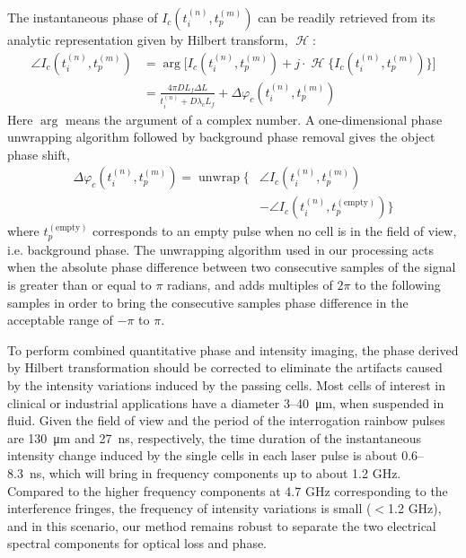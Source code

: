 \documentclass[aps,pra,reprint,longbibliography,superscriptaddress]{revtex4-1}
\DeclareMathOperator{\hilbert}{\mathcal{H}} %
\DeclareMathOperator{\unwrap}{unwrap} %
\begin{document}
The instantaneous phase of $I_c(t_i^{(n)}, t_p^{(m)})$ can be readily retrieved from its analytic representation given by Hilbert transform, $\hilbert$:
\begin{equation} \label{eqn:angle}
\begin{split}
\angle I_c(t_i^{(n)}, t_p^{(m)}) &= \arg\Big[I_c(t_i^{(n)}, t_p^{(m)}) + j \cdot \hilbert \lbrace I_c(t_i^{(n)}, t_p^{(m)}) \rbrace\Big] \\
&=  \frac{4\pi D L_f\Delta L}{t_i^{(n)} + D\lambda_c L_f} + \Delta \varphi_c(t_i^{(n)}, t_p^{(m)})
\end{split}
\end{equation}
Here $\arg$ means the argument of a complex number. A one-dimensional phase unwrapping algorithm followed by background phase removal gives the object phase shift, 
\begin{equation}
\begin{split}
\Delta\varphi_c(t_i^{(n)}, t_p^{(m)}) = \unwrap \lbrace &\angle I_c(t_i^{(n)}, t_p^{(m)}) \\
&- \angle I_c(t_i^{(n)}, t_p^{(\text{empty})}) \rbrace
\end{split}
\end{equation}
where $t_p^{(\text{empty})}$ corresponds to an empty pulse when no cell is in the field of view, i.e. background phase. The unwrapping algorithm used in our processing acts when the absolute phase difference between two consecutive samples of the signal is greater than or equal to $\pi$ radians, and adds multiples of $2\pi$ to the following samples in order to bring the consecutive samples phase difference in the acceptable range of $-\pi$ to $\pi$. 

To perform combined quantitative phase and intensity imaging, the phase derived by Hilbert transformation should be corrected to eliminate the artifacts caused by the intensity variations induced by the passing cells. Most cells of interest in clinical or industrial applications have a diameter 3--\SI{40}{\micro\meter}, when suspended in fluid. Given the field of view and the period of the interrogation rainbow pulses are \SI{130}{\micro\meter} and \SI{27}{\nano\second}, respectively, the time duration of the instantaneous intensity change induced by the single cells in each laser pulse is about 0.6--\SI{8.3}{\nano\second}, which will bring in frequency components up to about 1.2 GHz. Compared to the higher frequency components at 4.7 GHz corresponding to the interference fringes, the frequency of intensity variations is small ($<$1.2 GHz), and in this scenario, our method remains robust to separate the two electrical spectral components for optical loss and phase.
\end{document}
